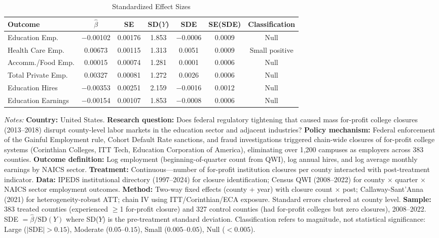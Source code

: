 \begin{table}[htbp]
\centering
\caption{Standardized Effect Sizes}
\label{tab:sde}
\begin{adjustbox}{max width=\textwidth}
\begin{tabular}{lcccccc}
\hline\hline
Outcome & $\hat{\beta}$ & SE & SD($Y$) & SDE & SE(SDE) & Classification \\
\hline
Education Emp. & $-$0.00102 & 0.00176 & 1.853 & $-$0.0006 & 0.0009 & Null \\
Health Care Emp. & 0.00673 & 0.00115 & 1.313 & 0.0051 & 0.0009 & Small positive \\
Accomm./Food Emp. & 0.00015 & 0.00074 & 1.281 & 0.0001 & 0.0006 & Null \\
Total Private Emp. & 0.00327 & 0.00081 & 1.272 & 0.0026 & 0.0006 & Null \\
Education Hires & $-$0.00353 & 0.00251 & 2.159 & $-$0.0016 & 0.0012 & Null \\
Education Earnings & $-$0.00154 & 0.00107 & 1.853 & $-$0.0008 & 0.0006 & Null \\
\hline\hline
\end{tabular}
\end{adjustbox}
\begin{tablenotes}[flushleft]\small
\item \textit{Notes:} \textbf{Country:} United States. \textbf{Research question:} Does federal regulatory tightening that caused mass for-profit college closures (2013--2018) disrupt county-level labor markets in the education sector and adjacent industries? \textbf{Policy mechanism:} Federal enforcement of the Gainful Employment rule, Cohort Default Rate sanctions, and fraud investigations triggered chain-wide closures of for-profit college systems (Corinthian Colleges, ITT Tech, Education Corporation of America), eliminating over 1,200 campuses as employers across 383 counties. \textbf{Outcome definition:} Log employment (beginning-of-quarter count from QWI), log annual hires, and log average monthly earnings by NAICS sector. \textbf{Treatment:} Continuous---number of for-profit institution closures per county interacted with post-treatment indicator. \textbf{Data:} IPEDS institutional directory (1997--2024) for closure identification; Census QWI (2008--2022) for county $\times$ quarter $\times$ NAICS sector employment outcomes. \textbf{Method:} Two-way fixed effects (county + year) with closure count $\times$ post; Callaway-Sant'Anna (2021) for heterogeneity-robust ATT; chain IV using ITT/Corinthian/ECA exposure. Standard errors clustered at county level. \textbf{Sample:} 383 treated counties (experienced $\geq$1 for-profit closure) and 327 control counties (had for-profit colleges but zero closures), 2008--2022. SDE $= \hat{\beta} / \text{SD}(Y)$ where SD($Y$) is the pre-treatment standard deviation. Classification refers to magnitude, not statistical significance: Large ($|$SDE$| > 0.15$), Moderate ($0.05$--$0.15$), Small ($0.005$--$0.05$), Null ($< 0.005$).
\end{tablenotes}
\end{table}
